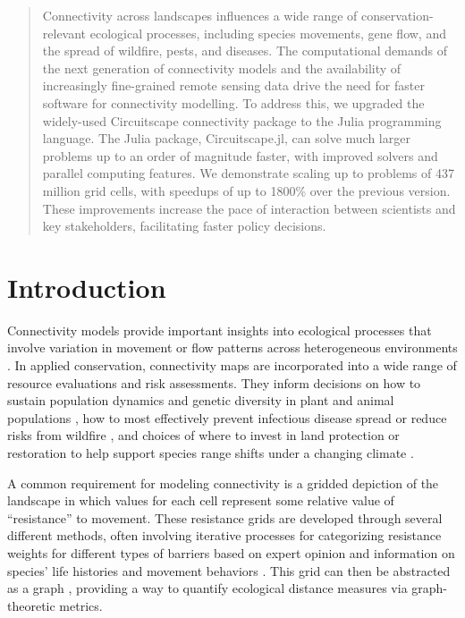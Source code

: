 \documentclass{juliacon}
\begin{document}

\maketitle

\begin{abstract}
Connectivity across landscapes influences a wide range of conservation-relevant ecological processes, including species movements, gene flow, and the spread of wildfire, pests, and diseases. The computational demands of the next generation of connectivity models and the availability of increasingly fine-grained remote sensing data drive the need for faster software for connectivity modelling. To address this, we upgraded the widely-used Circuitscape connectivity package to the Julia programming language. The Julia package, Circuitscape.jl, can solve much larger problems up to an order of magnitude faster, with improved solvers and parallel computing features. We demonstrate scaling up to problems of 437 million grid cells, with speedups of up to 1800\% over the previous version. These improvements increase the pace of interaction between scientists and key stakeholders, facilitating faster policy decisions. 

\end{abstract}

\section{Introduction}
Connectivity models provide important insights into ecological processes that involve variation in movement or flow patterns across heterogeneous environments \cite{crooks2006}. In applied conservation, connectivity maps are incorporated into a wide range of resource evaluations and risk assessments. They inform decisions on how to sustain population dynamics and genetic diversity in plant and animal populations \cite{kareiva1995connecting}, how to most effectively prevent infectious disease spread or reduce risks from wildfire \cite{gray2016applying}, and choices of where to invest in land protection or restoration to help support species range shifts under a changing climate \cite{heller2009biodiversity, littlefield2017connecting, keeley2017habitat}.  

A common requirement for modeling connectivity is a gridded depiction of the landscape in which values for each cell represent some relative value of “resistance” to movement. These resistance grids are developed through several different methods, often involving iterative processes for categorizing resistance weights for different types of barriers based on expert opinion and information on species’ life histories and movement behaviors \cite{spear2010use, zeller2012estimating}. This grid can then be abstracted as a graph \cite{urban2001landscape}, providing a way to quantify ecological distance measures via graph-theoretic metrics. 
\end{document}
